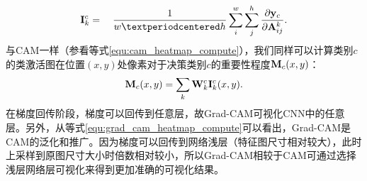 \begin{equation}
\ve{I}_{k}^{c}=\quad \frac{1}{w·h} \sum_{i}^{w} \sum_{j}^{h} \frac{\partial \ve{y}_{c}}{\partial \ve{A}_{i j}^{k}}.
\end{equation}
与CAM一样（参看等式\ref{equ:cam_heatmap_compute}），我们同样可以计算类别$c$的类激活图在位置$(x,y)$处像素对于决策类别$c$的重要性程度$\mathbf{M}_c(x, y)$：
\begin{equation}\label{equ:grad_cam_heatmap_compute}
\mathbf{M}_{c}(x, y)=\sum_{k} \mathbf{W}_{k}^{c} \mathbf{I}_{k}^c(x, y).
\end{equation}
在梯度回传阶段，梯度可以回传到任意层，故Grad-CAM可视化CNN中的任意层。另外，从等式\ref{equ:grad_cam_heatmap_compute}可以看出，Grad-CAM是CAM的泛化和推广。因为梯度可以回传到网络浅层（特征图尺寸相对较大），此时上采样到原图尺寸大小时倍数相对较小，所以Grad-CAM相较于CAM可通过选择浅层网络层可视化来得到更加准确的可视化结果。
